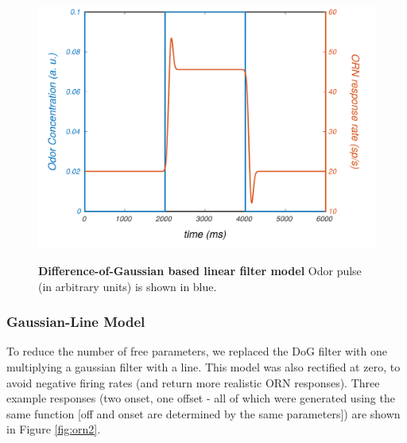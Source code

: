 \documentclass[a4paper,12pt,twoside]{article}
\begin{document}
\begin{figure}
\centering
\caption{\textbf{Difference-of-Gaussian based linear filter model} Odor pulse (in arbitrary units) is shown in blue.}
\hspace*{-1.25cm}\includegraphics[scale=1]{2016-06-17ModelORNresponse.png}
\label{fig:orn1}
\end{figure}
\subsubsection{Gaussian-Line Model}
To reduce the number of free parameters, we replaced the DoG filter with one multiplying a gaussian filter with a line.  This model was also rectified at zero, to avoid negative firing rates (and return more realistic ORN responses).  Three example responses (two onset, one offset - all of which were generated using the same function [off and onset are determined by the same parameters]) are shown in Figure \ref{fig:orn2}.  
\end{document}
